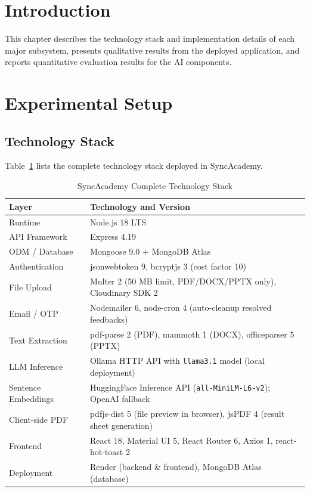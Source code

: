 \documentclass[12pt,a4paper]{report}
\begin{document}
\section{Introduction}

This chapter describes the technology stack and implementation details of each major subsystem, presents qualitative results from the deployed application, and reports quantitative evaluation results for the AI components.

\section{Experimental Setup}

\subsection{Technology Stack}

Table~\ref{tab:stack} lists the complete technology stack deployed in SyncAcademy.

\begin{table}[htbp]
\caption{SyncAcademy Complete Technology Stack}
\label{tab:stack}
\centering
\small
\begin{tabularx}{\textwidth}{|l|X|}
\hline
\textbf{Layer} & \textbf{Technology and Version} \\
\hline
Runtime & Node.js 18 LTS \\
API Framework & Express 4.19 \\
ODM / Database & Mongoose 9.0 + MongoDB Atlas \\
Authentication & jsonwebtoken 9, bcryptjs 3 (cost factor 10) \\
File Upload & Multer 2 (50 MB limit, PDF/DOCX/PPTX only), Cloudinary SDK 2 \\
Email / OTP & Nodemailer 6, node-cron 4 (auto-cleanup resolved feedbacks) \\
Text Extraction & pdf-parse 2 (PDF), mammoth 1 (DOCX), officeparser 5 (PPTX) \\
LLM Inference & Ollama HTTP API with \texttt{llama3.1} model (local deployment) \\
Sentence Embeddings & HuggingFace Inference API (\texttt{all-MiniLM-L6-v2}); OpenAI fallback \\
Client-side PDF & pdfjs-dist 5 (file preview in browser), jsPDF 4 (result sheet generation) \\
Frontend & React 18, Material UI 5, React Router 6, Axios 1, react-hot-toast 2 \\
Deployment & Render (backend \& frontend), MongoDB Atlas (database) \\
\hline
\end{tabularx}
\end{table}
\end{document}
